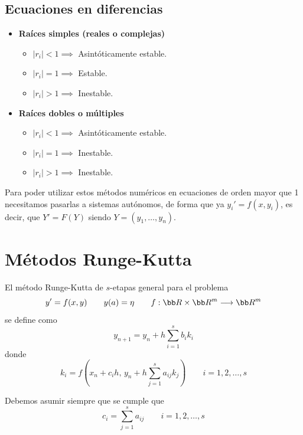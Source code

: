 \subsection*{Ecuaciones en diferencias}
\begin{itemize}
    \item \textbf{Raíces simples (reales o complejas)}
    \begin{itemize}
        \item $|r_i| < 1 \implies$ Asintóticamente estable.
        \item $|r_i| = 1 \implies$ Estable.
        \item $|r_i| > 1 \implies$ Inestable.
    \end{itemize}
    
    \item \textbf{Raíces dobles o múltiples}
    \begin{itemize}
        \item $|r_i| < 1 \implies$ Asintóticamente estable.
        \item $|r_i| = 1 \implies$ Inestable.
        \item $|r_i| > 1 \implies$ Inestable.
    \end{itemize}
\end{itemize}
\begin{obs}
    Para poder utilizar estos m\'etodos num\'ericos en ecuaciones de orden mayor que 1 necesitamos pasarlas a sistemas aut\'onomos, de forma que ya $y_i'=f(x,y_i)$, es decir, que $Y'=F(Y)$ siendo $Y = (y_1, \ldots, y_n)$. 
\end{obs}
\section{M\'etodos Runge-Kutta}
\begin{defi}
    El m\'etodo Runge-Kutta de $s$-etapas general para el problema
    $$y' = f(x,y) \qquad y(a)=\eta \qquad f:\bb R \times \bb R^m \longrightarrow \bb R^m$$
    se define como
    $$y_{n+1} = y_n + h \sum_{i=1}^s b_i k_i$$
    donde 
    $$k_i = f \left( x_n +c_i h, \, y_n + h \sum_{j=1}^s a_{ij} k_j \right)\qquad i=1,2,\ldots, s$$
\end{defi}

Debemos asumir siempre que se cumple que 
$$c_i = \sum_{j=1}^s a_{ij} \qquad i=1,2,\ldots, s$$

